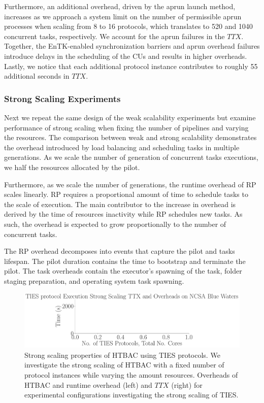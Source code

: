 
Furthermore, an additional overhead, driven by the aprun launch method,
increases as we approach a system limit on the number of permissible aprun
processes when scaling from 8 to 16 protocols, which translates to 520 and
1040 concurrent tasks, respectively. We account for the aprun failures in the
\(TTX\). Together, the EnTK-enabled synchronization barriers and aprun
overhead failures introduce delays in the scheduling of the CUs and results
in higher overheads. Lastly, we notice that each additional protocol instance
contributes to roughly 55 additional seconds in \(TTX\).

\subsubsection{Strong Scaling Experiments}

Next we repeat the same design of the weak scalability experiments but
examine performance of strong scaling when fixing the number of pipelines and
varying the resources. The comparison between weak and strong scalability
demonstrates the overhead introduced by load balancing and scheduling tasks
in multiple generations. As we scale the number of generation of concurrent
tasks executions, we half the resources allocated by the pilot.

Furthermore, as we scale the number of generations, the runtime overhead of
RP scales linearly. RP requires a proportional amount of time to schedule
tasks to the scale of execution. The main contributor to the increase in
overhead is derived by the time of resources inactivity while RP schedules
new tasks. As such, the overhead is expected to grow proportionally to the
number of concurrent tasks.

The RP overhead decomposes into events that capture the pilot and tasks
lifespan. The pilot duration contains the time to bootstrap and terminate the
pilot. The task overheads contain the executor's spawning of the task, folder
staging preparation, and operating system task spawning.

\begin{figure}
  \centering
    \includegraphics[width=\columnwidth]{figures/ties_ss_pseudo.pdf}
    \caption{Strong scaling properties of HTBAC using TIES protocols. We
    investigate the strong scaling of HTBAC with a fixed number of protocol
    instances while varying the amount resources. Overheads of HTBAC and
    runtime overhead (left) and \(TTX\) (right) for experimental
    configurations investigating the strong scaling of TIES.}
\label{fig:strong_scaling_TIES}
\end{figure}


